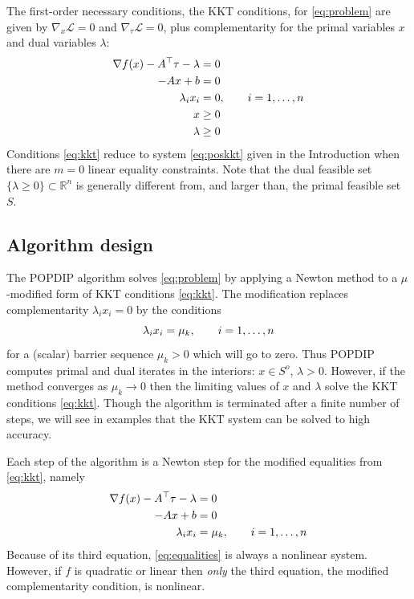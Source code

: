 \documentclass[11pt]{article}
\newcommand{\RR}{\mathbb{R}}
\newcommand{\grad}{\nabla}
\begin{document}
The first-order necessary conditions, the KKT conditions, for \eqref{eq:problem} are given by $\grad_x\mathcal{L}=0$ and $\grad_\tau\mathcal{L}=0$, plus complementarity for the primal variables $x$ and dual variables $\lambda$:
\begin{align}
\grad f(x) - A^\top \tau - \lambda &= 0 \label{eq:kkt} \\
-A x + b &= 0 \notag \\
\lambda_i x_i &=0, \qquad i=1,\dots,n \notag \\
x &\ge 0 \notag \\
\lambda &\ge 0 \notag
\end{align}
Conditions \eqref{eq:kkt} reduce to system \eqref{eq:poskkt} given in the Introduction when there are $m=0$ linear equality constraints.  Note that the dual feasible set $\{\lambda \ge 0\}\subset \RR^n$ is generally different from, and larger than, the primal feasible set $S$.


\subsection*{Algorithm design}

The POPDIP algorithm solves \eqref{eq:problem} by applying a Newton method to a $\mu$-modified form of KKT conditions \eqref{eq:kkt}.  The modification replaces complementarity $\lambda_i x_i = 0$ by the conditions
\begin{equation}
\lambda_i x_i = \mu_k, \qquad i=1,\dots,n \notag \\
\end{equation}
for a (scalar) barrier sequence $\mu_k>0$ which will go to zero.  Thus POPDIP computes primal and dual iterates in the interiors: $x \in S^o$, $\lambda > 0$.  However, if the method converges as $\mu_k \to 0$ then the limiting values of $x$ and $\lambda$ solve the KKT conditions \eqref{eq:kkt}.  Though the algorithm is terminated after a finite number of steps, we will see in examples that the KKT system can be solved to high accuracy.

Each step of the algorithm is a Newton step for the modified equalities from \eqref{eq:kkt}, namely
\begin{align}
\grad f(x) - A^\top \tau - \lambda &= 0 \label{eq:equalities} \\
-A x + b &= 0 \notag \\
\lambda_i x_i &= \mu_k, \qquad i=1,\dots,n \notag
\end{align}
Because of its third equation, \eqref{eq:equalities} is always a nonlinear system.  However, if $f$ is quadratic or linear then \emph{only} the third equation, the modified complementarity condition, is nonlinear.
\end{document}
